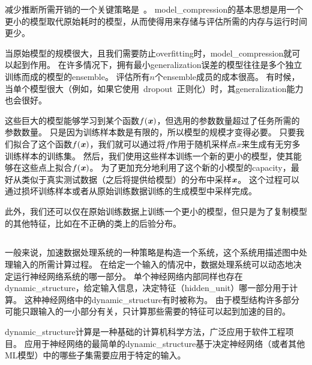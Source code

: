 减少推断所需开销的一个关键策略是~\citep{bucilua2006model}。
\gls{model_compression}的基本思想是用一个更小的模型取代原始耗时的模型，从而使得用来存储与评估所需的内存与运行时间更少。



当原始模型的规模很大，且我们需要防止\gls{overfitting}时，\gls{model_compression}就可以起到作用。
在许多情况下，拥有最小\gls{generalization}误差的模型往往是多个独立训练而成的模型的\gls{ensemble}。
评估所有$n$个\gls{ensemble}成员的成本很高。
有时候，当单个模型很大（例如，如果它使用~\gls{dropout}~正则化）时，其\gls{generalization}能力也会很好。

这些巨大的模型能够学习到某个函数$f(\boldsymbol{\mathit{x}})$，但选用的参数数量超过了任务所需的参数数量。
只是因为训练样本数是有限的，所以模型的规模才变得必要。
只要我们拟合了这个函数$f(\boldsymbol{\mathit{x}})$，我们就可以通过将$f$作用于随机采样点$x$来生成有无穷多训练样本的训练集。
然后，我们使用这些样本训练一个新的更小的模型，使其能够在这些点上拟合$f(\boldsymbol{\mathit{x}})$。
为了更加充分地利用了这个新的小模型的\gls{capacity}，最好从类似于真实测试数据（之后将提供给模型）的分布中采样$\boldsymbol{\mathit{x}}$。
这个过程可以通过损坏训练样本或者从原始训练数据训练的生成模型中采样完成。

此外，我们还可以仅在原始训练数据上训练一个更小的模型，但只是为了复制模型的其他特征，比如在不正确的类上的后验分布\citep{Hinton-dark-2014,hinton2015distilling}。

\subsection{}
\label{sec:dynamic_structure}

一般来说，加速数据处理系统的一种策略是构造一个系统，这个系统用描述图中处理输入的所需计算过程。
在给定一个输入的情况中，数据处理系统可以动态地决定运行神经网络系统的哪一部分。
单个神经网络内部同样也存在\gls{dynamic_structure}，给定输入信息，决定特征（\gls{hidden_unit}）哪一部分用于计算。
这种神经网络中的\gls{dynamic_structure}有时被称为\citep{Bengio-chapterSLSP-2013,bengio2013estimating}。
由于模型结构许多部分可能只跟输入的一小部分有关，只计算那些需要的特征可以起到加速的目的。

\gls{dynamic_structure}计算是一种基础的计算机科学方法，广泛应用于软件工程项目。
应用于神经网络的最简单的\gls{dynamic_structure}基于决定神经网络（或者其他\gls{ML}模型）中的哪些子集需要应用于特定的输入。


